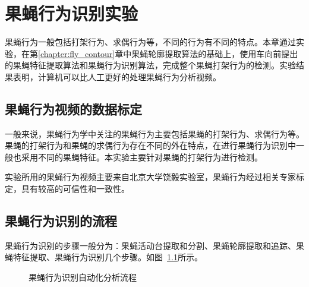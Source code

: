 \chapter{果蝇行为识别实验}\label{chap:fly_behavior_detection}

果蝇行为一般包括打架行为、求偶行为等，不同的行为有不同的特点。本章通过实验，在第\ref{chapter:fly_contour}章中果蝇轮廓提取算法的基础上，使用车向前提出的果蝇特征提取算法和果蝇行为识别算法\cite{chexiangqian}，完成整个果蝇打架行为的检测。实验结果表明，计算机可以比人工更好的处理果蝇行为分析视频。

\section{果蝇行为视频的数据标定} \label{sec:fly_behavior_character}

一般来说，果蝇行为学中关注的果蝇行为主要包括果蝇的打架行为、求偶行为等\cite{copulation_2009}。果蝇的打架行为和果蝇的求偶行为存在不同的外在特点，在进行果蝇行为识别中一般也采用不同的果蝇特征。本实验主要针对果蝇的打架行为进行检测。

实验所用的果蝇行为视频主要来自北京大学饶毅实验室，果蝇行为经过相关专家标定，具有较高的可信性和一致性。

\section{果蝇行为识别的流程}

果蝇行为识别的步骤一般分为：果蝇活动台提取和分割、果蝇轮廓提取和追踪、果蝇特征提取、果蝇行为识别几个步骤。如图~\ref{fig:fly_detection_procedure}所示。

\begin{figure}
\centering
{}
\caption{果蝇行为识别自动化分析流程}
\label{fig:fly_detection_procedure}
\end{figure}

